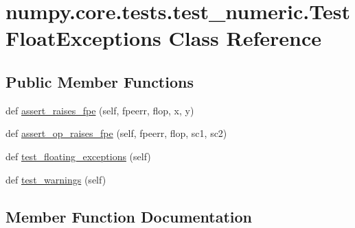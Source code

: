 \hypertarget{classnumpy_1_1core_1_1tests_1_1test__numeric_1_1TestFloatExceptions}{}\section{numpy.\+core.\+tests.\+test\+\_\+numeric.\+Test\+Float\+Exceptions Class Reference}
\label{classnumpy_1_1core_1_1tests_1_1test__numeric_1_1TestFloatExceptions}
\subsection*{Public Member Functions}
\begin{DoxyCompactItemize}
\item 
def \hyperlink{classnumpy_1_1core_1_1tests_1_1test__numeric_1_1TestFloatExceptions_a99d3746e6052415d8b8e2c7ca96807a9}{assert\+\_\+raises\+\_\+fpe} (self, fpeerr, flop, x, y)
\item 
def \hyperlink{classnumpy_1_1core_1_1tests_1_1test__numeric_1_1TestFloatExceptions_ac014b0be5be8bc69718253ff086dc36d}{assert\+\_\+op\+\_\+raises\+\_\+fpe} (self, fpeerr, flop, sc1, sc2)
\item 
def \hyperlink{classnumpy_1_1core_1_1tests_1_1test__numeric_1_1TestFloatExceptions_a56a47ca32193884802b3e31b3091b169}{test\+\_\+floating\+\_\+exceptions} (self)
\item 
def \hyperlink{classnumpy_1_1core_1_1tests_1_1test__numeric_1_1TestFloatExceptions_a5f0613aed29988977d6f66643349c166}{test\+\_\+warnings} (self)
\end{DoxyCompactItemize}


\subsection{Member Function Documentation}
\mbox{\label{classnumpy_1_1core_1_1tests_1_1test__numeric_1_1TestFloatExceptions_ac014b0be5be8bc69718253ff086dc36d}} 
